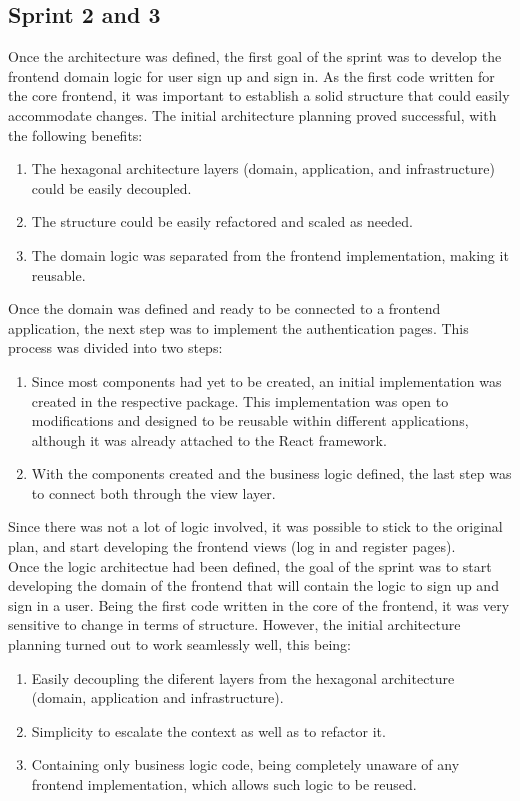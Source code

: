\documentclass[../memory.tex]{subfiles}
\begin{document}
\subsection{Sprint 2 and 3}
Once the architecture was defined, the first goal of the sprint was to develop
the frontend domain logic for user sign up and sign in. As the first code
written for the core frontend, it was important to establish a solid structure
that could easily accommodate changes. The initial architecture planning proved
successful, with the following benefits:
\begin{enumerate}[label = -]
	\item The hexagonal architecture layers (domain, application, and
	      infrastructure) could be easily decoupled.
	\item The structure could be easily refactored and scaled as needed.
	\item The domain logic was separated from the frontend implementation, making
	      it reusable.
\end{enumerate}
Once the domain was defined and ready to be connected to a frontend application,
the next step was to implement the authentication pages. This process was
divided into two steps:
\begin{enumerate}[label = \arabic{*}.]
	\item Since most components had yet to be created, an initial implementation
	      was created in the respective package. This implementation was open to
	      modifications and designed to be reusable within different applications,
	      although it was already attached to the React framework.
	\item With the components created and the business logic defined, the last
	      step was to connect both through the view layer.
\end{enumerate}
Since there was not a lot of logic involved, it was possible to stick to the
original plan, and start developing the frontend views (log in and register
pages).
\\
Once the logic architectue had been defined, the goal of the sprint was to start
developing the domain of the frontend that will contain the logic to sign up and
sign in a user. Being the first code written in the core of the frontend, it was
very sensitive to change in terms of structure. However, the initial
architecture planning turned out to work seamlessly well, this being:
\begin{enumerate}[label = -]
	\item Easily decoupling the diferent layers from the hexagonal architecture
	      (domain, application and infrastructure).
	\item Simplicity to escalate the context as well as to refactor it.
	\item Containing only business logic code, being completely unaware of any
	      frontend implementation, which allows such logic to be reused.
\end{enumerate}
\end{document}
